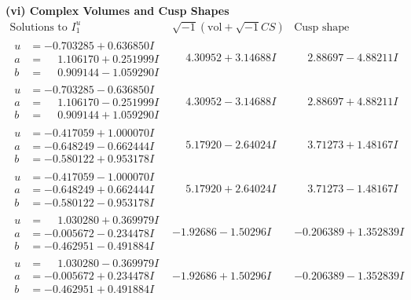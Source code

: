 \documentclass[1p]{elsarticle_modified}
\theoremstyle{definition}
\newcommand{\I}{\sqrt{-1}}
\begin{document}
\newpage\flushleft \textbf{(vi) Complex Volumes and Cusp Shapes}
$$\begin{array}{c|c|c}  
\text{Solutions to }I^u_{1}& \I (\text{vol} + \sqrt{-1}CS) & \text{Cusp shape}\\
 \hline 
\begin{aligned}
u &= -0.703285 + 0.636850 I \\
a &= \phantom{-}1.106170 + 0.251999 I \\
b &= \phantom{-}0.909144 - 1.059290 I\end{aligned}
 & \phantom{-}4.30952 + 3.14688 I & \phantom{-}2.88697 - 4.88211 I \\ \hline\begin{aligned}
u &= -0.703285 - 0.636850 I \\
a &= \phantom{-}1.106170 - 0.251999 I \\
b &= \phantom{-}0.909144 + 1.059290 I\end{aligned}
 & \phantom{-}4.30952 - 3.14688 I & \phantom{-}2.88697 + 4.88211 I \\ \hline\begin{aligned}
u &= -0.417059 + 1.000070 I \\
a &= -0.648249 - 0.662444 I \\
b &= -0.580122 + 0.953178 I\end{aligned}
 & \phantom{-}5.17920 - 2.64024 I & \phantom{-}3.71273 + 1.48167 I \\ \hline\begin{aligned}
u &= -0.417059 - 1.000070 I \\
a &= -0.648249 + 0.662444 I \\
b &= -0.580122 - 0.953178 I\end{aligned}
 & \phantom{-}5.17920 + 2.64024 I & \phantom{-}3.71273 - 1.48167 I \\ \hline\begin{aligned}
u &= \phantom{-}1.030280 + 0.369979 I \\
a &= -0.005672 - 0.234478 I \\
b &= -0.462951 - 0.491884 I\end{aligned}
 & -1.92686 - 1.50296 I & -0.206389 + 1.352839 I \\ \hline\begin{aligned}
u &= \phantom{-}1.030280 - 0.369979 I \\
a &= -0.005672 + 0.234478 I \\
b &= -0.462951 + 0.491884 I\end{aligned}
 & -1.92686 + 1.50296 I & -0.206389 - 1.352839 I \\ \hline\begin{aligned}

\end{aligned}
\end{array}$$
\end{document}
